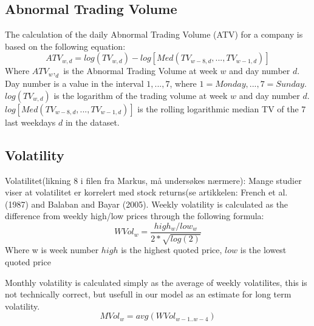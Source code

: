 \subsection{Abnormal Trading Volume}
The calculation of the daily Abnormal Trading Volume (ATV) for a company is based on the following equation: 
\begin{equation}
   \label{abnormal_volume} 
   ATV_{w,d} = log(TV_{w,d}) - log[Med(TV_{w-8,d},...,TV_{w-1,d})] 
\end{equation}
   Where $ATV_w,_d$ is the Abnormal Trading Volume at week $w$ and day number $d$. Day number is a value in the interval $1,...,7$, where $1=Monday,...,7=Sunday$. $log(TV_{w,d})$ is the logarithm of the trading volume at week $w$ and day number $d$. $log[Med(TV_{w-8,d},...,TV_{w-1,d})]$ is the rolling logarithmic median TV of the 7 last weekdays $d$ in the dataset.


\subsection{Volatility}
Volatilitet(likning 8 i filen fra Markus, må undersøkes nærmere): Mange studier viser at volatilitet er korrelert med stock returns(se artikkelen: French et al. (1987) and Balaban and Bayar (2005).
Weekly volatility is calculated as the difference from weekly high/low prices through the following formula:
\begin{equation}
   \label{w_volatility} 
   WVol_{w} = \frac{high_w/low_w}{2*\sqrt{log(2)}} 
\end{equation}
Where w is week number $high$ is the highest quoted price, $low$ is the lowest quoted price

Monthly volatility is calculated simply as the average of weekly volatilites, this is not technically correct, but usefull in our model as an estimate for long term volatility.
\begin{equation}
   \label{m_volatility} 
   MVol_{w} = avg( WVol_{w-1..w-4}) 
\end{equation}
